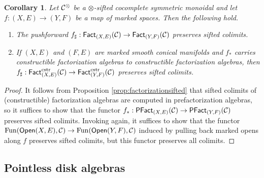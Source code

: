 \documentclass[10pt, reqno, twoside
, final
]{amsart}
\numberwithin{equation}{subsection}%
\theoremstyle{definition}
\theoremstyle{definition}
\theoremstyle{definition}
\theoremstyle{definition}
\theoremstyle{definition}
\theoremstyle{definition}
\theoremstyle{definition}
\theoremstyle{definition}
\theoremstyle{definition}
\theoremstyle{plain}
\theoremstyle{definition}
\theoremstyle{plain}
\theoremstyle{definition}
\theoremstyle{plain}
\newtheorem{cor}[defn]{Corollary}
\theoremstyle{definition}
\theoremstyle{definition}
\theoremstyle{plain}
\theoremstyle{plain}
\theoremstyle{definition}
\theoremstyle{plain}
\theoremstyle{plain}
\theoremstyle{plain}
\begin{document}
\begin{cor}\label{cor:factorizationsifted}
Let $\mathcal{C}^{\otimes}$ be a $\otimes$-sifted cocomplete symmetric monoidal \infcat and let $f:(X,E)\rightarrow (Y,F)$ be a map of marked spaces. Then the following hold.
\begin{enumerate}[$(1)$]
    \item The pushforward $f_{\sharp}:\mathsf{Fact}_{(X,E)}(\mathcal{C})\rightarrow \mathsf{Fact}_{(Y,F)}(\mathcal{C})$ preserves sifted colimits. 
    \item If $(X,E)$ and $(F,E)$ are marked smooth conical manifolds and $f_*$ carries constructible factorization algebras to constructible factorization algebras, then $f_{\sharp}:\mathsf{Fact}_{(X,E)}^{\mathrm{cstr}}(\mathcal{C})\rightarrow \mathsf{Fact}^{\mathrm{cstr}}_{(Y,F)}(\mathcal{C})$ preserves sifted colimits.
\end{enumerate}
\end{cor}
\begin{proof}
It follows from Proposition \ref{prop:factorizationsifted} that sifted colimits of (constructible) factorization algebras are computed in prefactorization algebras, so it suffices to show that the functor $f_*:\mathsf{PFact}_{(X,E)}(\mathcal{C})\rightarrow \mathsf{PFact}_{(Y,F)}(\mathcal{C})$ preserves sifted colimits. Invoking \cite[Theorem 3.2.3.1]{LurHA} again, it suffices to show that the functor $\mathrm{Fun}(\mathsf{Open}(X,E),\mathcal{C})\rightarrow \mathrm{Fun}(\mathsf{Open}(Y,F),\mathcal{C})$ induced by pulling back marked opens along $f$ preserves sifted colimits, but this functor preserves all colimits.
\end{proof}


\subsection{Pointless disk algebras}\label{sec:plessdisks}
\end{document}
